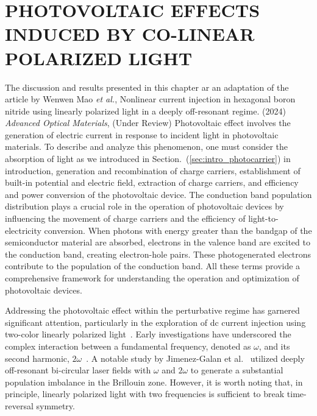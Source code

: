 \chapter{PHOTOVOLTAIC EFFECTS INDUCED BY CO-LINEAR POLARIZED LIGHT \label{ch:ch3}} 
 The discussion and results presented in this chapter ar an adaptation of the article by Wenwen Mao \emph{et al.},  Nonlinear current injection in hexagonal boron nitride using linearly polarized light in a deeply off-resonant regime. (2024) {\it Advanced Optical Materials}, (Under Review)
\color{red}
Photovoltaic effect involves the generation of electric current in response to incident light in photovoltaic materials. To describe and analyze this phenomenon, one must consider the absorption of light as we introduced in Section.~(\ref{sec:intro_photocarrier}) in introduction, generation and recombination of charge carriers, establishment of built-in potential and electric field, extraction of charge carriers, and efficiency and power conversion of the photovoltaic device. The conduction band population distribution plays a crucial role in the operation of photovoltaic devices by influencing the movement of charge carriers and the efficiency of light-to-electricity conversion. When photons with energy greater than the bandgap of the semiconductor material are absorbed, electrons in the valence band are excited to the conduction band, creating electron-hole pairs. These photogenerated electrons contribute to the population of the conduction band. All these terms provide a comprehensive framework for understanding the operation and optimization of photovoltaic devices.
\color{black}

Addressing the photovoltaic effect within the perturbative regime has garnered significant
attention, particularly in the exploration of dc current injection using two-color linearly
polarized light~\cite{PhysRevLett.74.3596,PhysRevLett.76.1703,PhysRevLett.78.306,Sun2010,PhysRevB.100.075202,HeideBoolakeeEcksteinHommelhoff+2021+3701+3707,PhysRevLett.123.067402}.
Early investigations have underscored the complex interaction between a fundamental frequency, denoted as $\omega$, and its second harmonic, $2\omega$~\cite{PhysRevLett.74.3596,PhysRevLett.76.1703,PhysRevLett.78.306}. 
A notable study by Jimenez-Galan et al.~\cite{Jimenez-Galan2020} utilized deeply off-resonant bi-circular laser fields with $\omega$ and $2\omega$ to generate a substantial population imbalance in the Brillouin zone. However, it is worth noting that, in principle, linearly polarized light with two frequencies is sufficient to break time-reversal symmetry.

